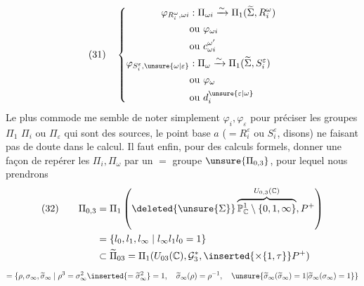 \[
(31)\quad\left\{\begin{aligned}
\varphi_{R_i^\omega,\omega i}&:\Pi_{\omega i}\xrightarrow{\sim}\Pi_1(\widetilde\Sigma,R_i^\omega)\\
&\text{ou }\varphi_{\omega i}\\
&\text{ou }c_{\omega i}^{\omega'}\\
\varphi_{S_i^\varepsilon,\unsure{\omega|\varepsilon}}&:\Pi_\omega\xrightarrow{\sim}\Pi_1(\widetilde\Sigma,S_i^\varepsilon)\\
&\text{ou }\varphi_\omega\\
&\text{ou }d_i^{\unsure{\varepsilon|\omega}}
\end{aligned}\right.
\]
Le plus commode me semble de noter simplement $\varphi_i,\varphi_\varepsilon$ pour préciser les groupes $\Pi_1$  $\Pi_i$ ou $\Pi_\varepsilon$ qui sont des sources, le point base $a$ ($=R_i^\varepsilon$ ou $S_i^\varepsilon$, disons) ne faisant pas de doute dans le calcul.
Il faut enfin, pour des calculs formels, donner une façon de repérer les $\Pi_i,\Pi_\omega$ par un $=$ groupe  $\unsure{\Pi_{0,3}}$, pour lequel nous prendrons
\[
\begin{aligned}
(32)\qquad\Pi_{0,3}&=\Pi_1\left(\deleted{\unsure{\Sigma}}\overbrace{\mathbb P^1_{\mathbb C}\setminus\{0,1,\infty\}}^{U_{0,3}(\mathbb C)},P^+\right)\\
&=\{l_0,l_1,l_\infty\mid l_\infty l_1l_0=1\}\\
&\subset\widetilde\Pi_{03}=\Pi_1(U_{03}(\mathbb C),\mathcal G_3^*,\inserted{\times\{1,\tau\}}P^+)
\end{aligned}
\]
\[
=\{\rho,\sigma_\infty,\widetilde\sigma_\infty\mid \rho^3=\sigma_\infty^2\inserted{=\widetilde\sigma_\infty^2}=1,\quad \widetilde\sigma_\infty(\rho)=\rho^{-1},\quad\unsure{\widetilde\sigma_\infty(\widetilde\sigma_\infty)=1|\widetilde\sigma_\infty(\sigma_\infty)=1}\}
\]


